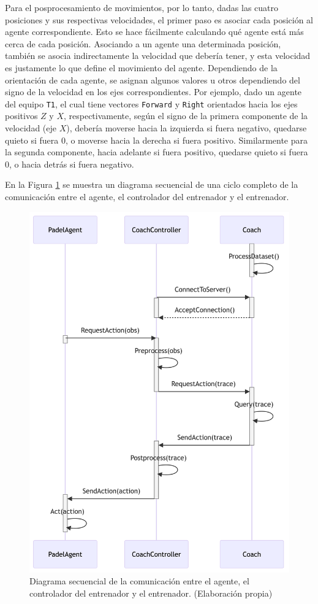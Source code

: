 Para el posprocesamiento de movimientos, por lo tanto, dadas las cuatro posiciones y sus respectivas velocidades, el primer paso es asociar cada posición al agente correspondiente. Esto se hace fácilmente calculando qué agente está más cerca de cada posición. Asociando a un agente una determinada posición, también se asocia indirectamente la velocidad que debería tener, y esta velocidad es justamente lo que define el movimiento del agente. Dependiendo de la orientación de cada agente, se asignan algunos valores u otros dependiendo del signo de la velocidad en los ejes correspondientes. Por ejemplo, dado un agente del equipo \texttt{T1}, el cual tiene vectores \texttt{Forward} y \texttt{Right} orientados hacia los ejes positivos $Z$ y $X$, respectivamente, según el signo de la primera componente de la velocidad (eje $X$), debería moverse hacia la izquierda si fuera negativo, quedarse quieto si fuera 0, o moverse hacia la derecha si fuera positivo. Similarmente para la segunda componente, hacia adelante si fuera positivo, quedarse quieto si fuera 0, o hacia detrás si fuera negativo.

En la Figura \ref{fig:diagrama_coach} se muestra un diagrama secuencial de una ciclo completo de la comunicación entre el agente, el controlador del entrenador y el entrenador.

\begin{figure}[H]
    \centering
    \includegraphics[width=12.5cm]{figures/diagrama_coach.png}
    \caption[Diagrama secuencial de la comunicación entre el agente, el controlador del entrenador y el entrenador]{Diagrama secuencial de la comunicación entre el agente, el controlador del entrenador y el entrenador. (Elaboración propia)}
    \label{fig:diagrama_coach}
\end{figure}